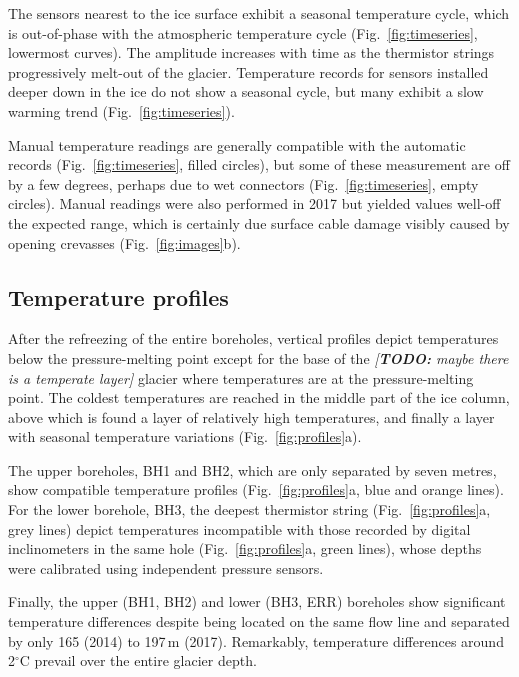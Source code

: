 \documentclass[utf8]{article}
\newcommand{\todo}[1]{\textcolor{c3}{\emph{[\textbf{TODO:} #1]}}}
\begin{document}
    The sensors nearest to the ice surface exhibit a seasonal temperature
    cycle, which is out-of-phase with the atmospheric temperature cycle
    (Fig.~\ref{fig:timeseries}, lowermost curves). The
    amplitude increases with time as the thermistor strings progressively
    melt-out of the glacier. Temperature records for sensors installed deeper
    down in the ice do not show a seasonal cycle, but many exhibit a slow
    warming trend (Fig.~\ref{fig:timeseries}).

    Manual temperature readings are generally compatible with the automatic
    records (Fig.~\ref{fig:timeseries}, filled circles), but some of these
    measurement are off by a few degrees, perhaps due to wet connectors
    (Fig.~\ref{fig:timeseries}, empty circles). Manual readings were also
    performed in 2017 but yielded values well-off the expected range, which
    is certainly due surface cable damage visibly caused by opening crevasses
    (Fig.~\ref{fig:images}b).


\subsection{Temperature profiles}

    After the refreezing of the entire boreholes, vertical profiles depict
    temperatures below the pressure-melting point except for the base of the
    \todo{maybe there is a temperate layer}
    glacier where temperatures are at the pressure-melting point. The coldest
    temperatures are reached in the middle part of the ice column, above which
    is found a layer of relatively high temperatures, and finally a layer with
    seasonal temperature variations (Fig.~\ref{fig:profiles}a).

    The upper boreholes, BH1 and BH2, which are only separated by seven metres,
    show compatible temperature profiles (Fig.~\ref{fig:profiles}a, blue and
    orange lines). For the lower borehole, BH3, the deepest thermistor string
    (Fig.~\ref{fig:profiles}a, grey lines) depict temperatures incompatible
    with those recorded by digital inclinometers in the same hole
    (Fig.~\ref{fig:profiles}a, green lines), whose depths were calibrated
    using independent pressure sensors.

    Finally, the upper (BH1, BH2) and lower (BH3, ERR) boreholes show
    significant temperature differences despite being located on the same
    flow line and separated by only 165 (2014) to 197\,m (2017). Remarkably,
    temperature differences
    around 2$^\circ$C prevail over the entire glacier depth.
\end{document}
